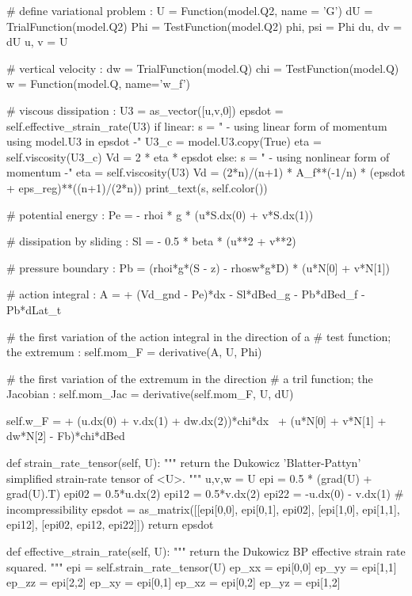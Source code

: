 \begin{python}[label=cslvr_first_order, caption={\CSLVR source code contained in the \texttt{MomentumDukowiczBP} class.}]
# define variational problem :
U        = Function(model.Q2, name = 'G')
dU       = TrialFunction(model.Q2)
Phi      = TestFunction(model.Q2)
phi, psi = Phi
du,  dv  = dU
u,   v   = U

# vertical velocity :
dw     = TrialFunction(model.Q)
chi    = TestFunction(model.Q)
w      = Function(model.Q, name='w_f')

# viscous dissipation :
U3     = as_vector([u,v,0])
epsdot = self.effective_strain_rate(U3)
if linear:
  s  = "    - using linear form of momentum using model.U3 in epsdot -"
  U3_c = model.U3.copy(True)
  eta  = self.viscosity(U3_c)
  Vd   = 2 * eta * epsdot
else:
  s  = "    - using nonlinear form of momentum -"
  eta  = self.viscosity(U3)
  Vd   = (2*n)/(n+1) * A_f**(-1/n) * (epsdot + eps_reg)**((n+1)/(2*n))
print_text(s, self.color())
  
# potential energy :
Pe     = - rhoi * g * (u*S.dx(0) + v*S.dx(1))

# dissipation by sliding :
Sl     = - 0.5 * beta * (u**2 + v**2)

# pressure boundary :
Pb     = (rhoi*g*(S - z) - rhosw*g*D) * (u*N[0] + v*N[1])

# action integral :
A      = + (Vd_gnd - Pe)*dx - Sl*dBed_g - Pb*dBed_f - Pb*dLat_t

# the first variation of the action integral in the direction of a 
# test function; the extremum :
self.mom_F = derivative(A, U, Phi)

# the first variation of the extremum in the direction 
# a tril function; the Jacobian :
self.mom_Jac = derivative(self.mom_F, U, dU)

self.w_F = + (u.dx(0) + v.dx(1) + dw.dx(2))*chi*dx \
           + (u*N[0] + v*N[1] + dw*N[2] - Fb)*chi*dBed
 
def strain_rate_tensor(self, U):
  """
  return the Dukowicz 'Blatter-Pattyn' simplified strain-rate tensor of <U>.
  """
  u,v,w  = U
  epi    = 0.5 * (grad(U) + grad(U).T)
  epi02  = 0.5*u.dx(2)
  epi12  = 0.5*v.dx(2)
  epi22  = -u.dx(0) - v.dx(1)  # incompressibility
  epsdot = as_matrix([[epi[0,0],  epi[0,1],  epi02],
                      [epi[1,0],  epi[1,1],  epi12],
                      [epi02,     epi12,     epi22]])
  return epsdot
  
def effective_strain_rate(self, U):
  """
  return the Dukowicz BP effective strain rate squared.
  """
  epi    = self.strain_rate_tensor(U)
  ep_xx  = epi[0,0]
  ep_yy  = epi[1,1]
  ep_zz  = epi[2,2]
  ep_xy  = epi[0,1]
  ep_xz  = epi[0,2]
  ep_yz  = epi[1,2]
  

\end{python}
